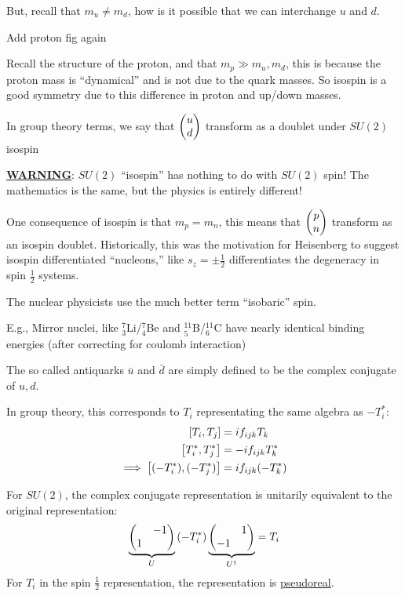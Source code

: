 But, recall that $m_u\neq m_d$, how is it possible that we can interchange $u$ and $d$.
\begin{TODO}
  Add proton fig again
\end{TODO}
Recall the structure of the proton, and that $m_p\gg m_u,m_d$, this is because the proton mass is ``dynamical'' and is not due to the quark masses. So isospin is a good symmetry due to this difference in proton and up/down masses.

In group theory terms, we say that $\pmqty{u\\d}$ transform as a doublet under $SU(2)$ isospin

\begin{remark}
  \underline{\textbf{WARNING}}: $SU(2)$ ``isospin'' has nothing to do with $SU(2)$ spin! The mathematics is the same, but the physics is entirely different!
\end{remark}
One consequence of isospin is that $m_p=m_n$, this means that $\pmqty{p\\n}$ transform as an isospin doublet. Historically, this was the motivation for Heisenberg to suggest isospin differentiated ``nucleons,'' like $s_z=\pm\frac12$ differentiates the degeneracy in spin $\frac12$ systems.
\begin{note}
  The nuclear physicists use the much better term ``isobaric'' spin.

  E.g., Mirror nuclei, like $^7_3$Li/$^7_4$Be and $^{11}_5$B/$^{11}_6$C have nearly identical binding energies (after correcting for coulomb interaction)
\end{note}

\begin{definition}[Antiquarks]
  The so called antiquarks $\bar{u}$ and $\bar{d}$ are simply defined to be the complex conjugate of $u,d$.

  In group theory, this corresponds to $T_i$ representating the same algebra as $-T_i^*$:
  \begin{align*}
    \comm{T_i}{T_j}&=if_{ijk}T_k\\
    \comm{T_i^*}{T_j^*}&=-if_{ijk}T_k^*\\
    \implies\comm{(-T_i^*)}{(-T_j^*)}&=if_{ijk}(-T_k^*)
  \end{align*}
\end{definition}

For $SU(2)$, the complex conjugate representation is unitarily equivalent to the original representation:
\begin{align*}
  \underbrace{\pmqty{&-1\\1}}_{U}\qty(-T_i^*)
  \underbrace{\pmqty{&1\\-1}}_{U^\dag}=T_i
\end{align*}
For $T_i$ in the spin $\frac12$ representation, the representation is \underline{pseudoreal}.

